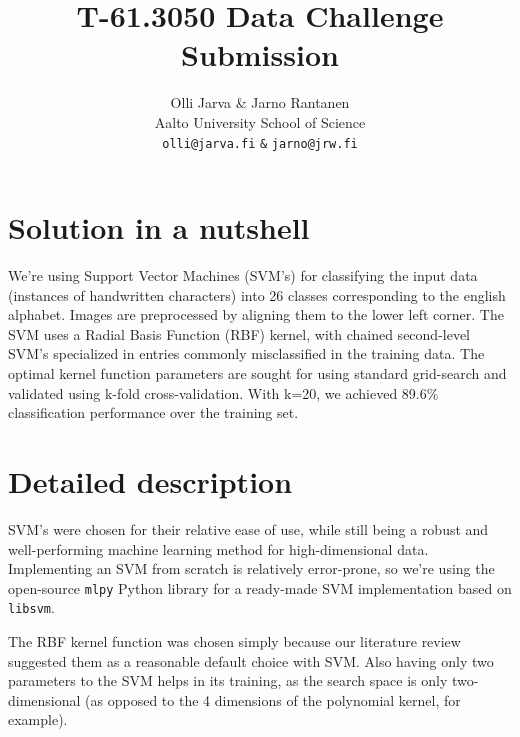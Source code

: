 \documentclass{netsec2012}
\begin{document}

\title{T-61.3050 Data Challenge Submission}

\author{Olli Jarva \& Jarno Rantanen \\
        Aalto University School of Science \\
	\texttt{olli@jarva.fi} \texttt{\&} \texttt{jarno@jrw.fi}}
\maketitle


\section{Solution in a nutshell}

We're using Support Vector Machines (SVM's) for classifying the input data (instances of 
handwritten characters) into 26 classes corresponding to the english alphabet. Images are 
preprocessed by aligning them to the lower left corner. The SVM uses a Radial Basis Function 
(RBF) kernel, with chained second-level SVM's specialized in entries commonly misclassified in 
the training data. The optimal kernel function parameters are sought for using standard 
grid-search and validated using k-fold cross-validation. With k=20, we achieved 89.6\% 
classification performance over the training set.

\section{Detailed description}

SVM's were chosen for their relative ease of use, while still being a robust and well-performing 
machine learning method for high-dimensional data.  Implementing an SVM from scratch is 
relatively error-prone, so we're using the open-source \texttt{mlpy} Python library for a 
ready-made SVM implementation based on \texttt{libsvm}.


The RBF kernel function was chosen simply because our literature review suggested them as a reasonable
default choice with SVM.  Also having only two parameters to the SVM helps in its training,
as the search space is only two-dimensional (as opposed to the 4 dimensions of the polynomial kernel,
for example).
\end{document}
